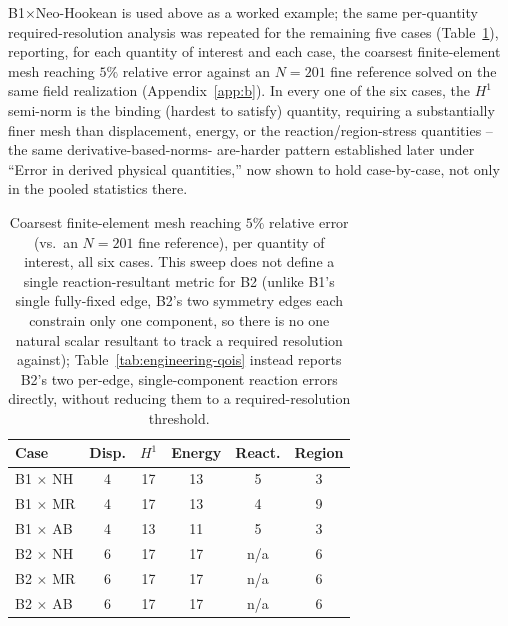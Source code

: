 \documentclass[final,5p,times]{elsarticle}
\begin{document}
B1$\times$Neo-Hookean is used above as a worked example; the same
per-quantity required-resolution analysis was repeated for the remaining
five cases (Table~\ref{tab:required-n}), reporting, for each quantity of
interest and each case, the coarsest finite-element mesh reaching $5\%$
relative error against an $N{=}201$ fine reference solved on the same
field realization (Appendix~\ref{app:b}). In every one of
the six cases, the $H^1$ semi-norm is the binding (hardest to satisfy)
quantity, requiring a substantially finer mesh than displacement, energy,
or the reaction/region-stress quantities -- the same derivative-based-norms-
are-harder pattern established later under ``Error in derived physical
quantities,'' now shown to hold case-by-case, not only in the pooled
statistics there.

\begin{table}[h]
\centering
\caption{Coarsest finite-element mesh reaching $5\%$ relative error (vs.\
  an $N{=}201$ fine reference), per quantity of interest, all six
  cases. This sweep does not define a single reaction-resultant metric
  for B2 (unlike B1's single fully-fixed edge, B2's two symmetry edges
  each constrain only one component, so there is no one natural scalar
  resultant to track a required resolution against); Table~\ref{tab:engineering-qois}
  instead reports B2's two per-edge, single-component reaction errors
  directly, without reducing them to a required-resolution threshold.}
\label{tab:required-n}
\small
\begin{tabular}{lccccc}
\toprule
Case & Disp. & $H^1$ & Energy & React. & Region \\
\midrule
B1 $\times$ NH & 4 & 17 & 13 & 5 & 3 \\
B1 $\times$ MR & 4 & 17 & 13 & 4 & 9 \\
B1 $\times$ AB & 4 & 13 & 11 & 5 & 3 \\
B2 $\times$ NH & 6 & 17 & 17 & n/a & 6 \\
B2 $\times$ MR & 6 & 17 & 17 & n/a & 6 \\
B2 $\times$ AB & 6 & 17 & 17 & n/a & 6 \\
\bottomrule
\end{tabular}
\end{table}
\end{document}
